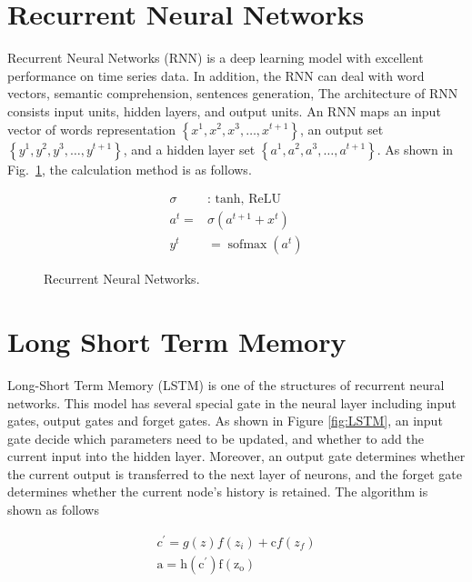 \section{Recurrent Neural Networks}

Recurrent Neural Networks (RNN) is a deep learning model with excellent performance on time series data. In addition, the RNN can deal with word vectors, semantic comprehension, sentences generation, \etc The architecture of RNN consists input units, hidden layers, and output units. An RNN maps an input vector of words representation $\left\{x^{1}, x^{2}, x^{3}, \ldots, x^{t+1}\right\}$, an output set $\left\{y^{1}, y^{2}, y^{3}, \ldots, y^{t+1}\right\}$, and a hidden layer set $\left\{a^{1}, a^{2}, a^{3}, \dots, a^{t+1}\right\}$. As shown in Fig.~\ref{fig:RNN}, the calculation method is as follows.

\begin{equation}
\begin{aligned} \sigma & : \text { tanh, ReLU } \\ a^{t}=& \sigma\left(a^{t+1}+x^{t}\right) \\ y^{t} &=\operatorname{sofmax}\left(a^{t}\right) \end{aligned}
\end{equation}

\begin{figure}[htb]
\centerline{}
\caption{Recurrent Neural Networks.}
\label{fig:RNN}
\end{figure}

\section{Long Short Term Memory}
Long-Short Term Memory (LSTM) is one of the structures of recurrent neural networks. This model has several special gate in the neural layer including input gates, output gates and forget gates. As shown in Figure \ref{fig:LSTM}, an input gate decide which parameters need to be updated, and whether to add the current input into the hidden layer. Moreover, an output gate determines whether the current output is transferred to the next layer of neurons, and the forget gate determines whether the current node's history is retained. The algorithm is shown as follows

\begin{equation}
\begin{array}{l}{c^{\prime}=g(z) f\left(z_{i}\right)+\mathrm{c} f\left(z_{f}\right)} \\ {\mathrm{a}=\mathrm{h}\left(\mathrm{c}^{\prime}\right) \mathrm{f}\left(\mathrm{z}_{\mathrm{o}}\right)}\end{array}
\end{equation}

